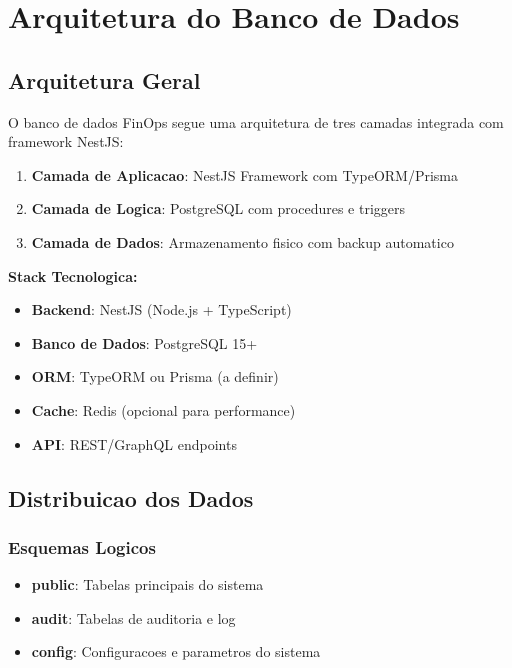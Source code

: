 \section{Arquitetura do Banco de Dados}

\subsection{Arquitetura Geral}

O banco de dados FinOps segue uma arquitetura de tres camadas integrada com framework NestJS:

\begin{enumerate}
    \item \textbf{Camada de Aplicacao}: NestJS Framework com TypeORM/Prisma
    \item \textbf{Camada de Logica}: PostgreSQL com procedures e triggers
    \item \textbf{Camada de Dados}: Armazenamento fisico com backup automatico
\end{enumerate}

\textbf{Stack Tecnologica:}
\begin{itemize}
    \item \textbf{Backend}: NestJS (Node.js + TypeScript)
    \item \textbf{Banco de Dados}: PostgreSQL 15+
    \item \textbf{ORM}: TypeORM ou Prisma (a definir)
    \item \textbf{Cache}: Redis (opcional para performance)
    \item \textbf{API}: REST/GraphQL endpoints
\end{itemize}

\subsection{Distribuicao dos Dados}

\subsubsection{Esquemas Logicos}
\begin{itemize}
    \item \textbf{public}: Tabelas principais do sistema
    \item \textbf{audit}: Tabelas de auditoria e log
    \item \textbf{config}: Configuracoes e parametros do sistema
\end{itemize}

